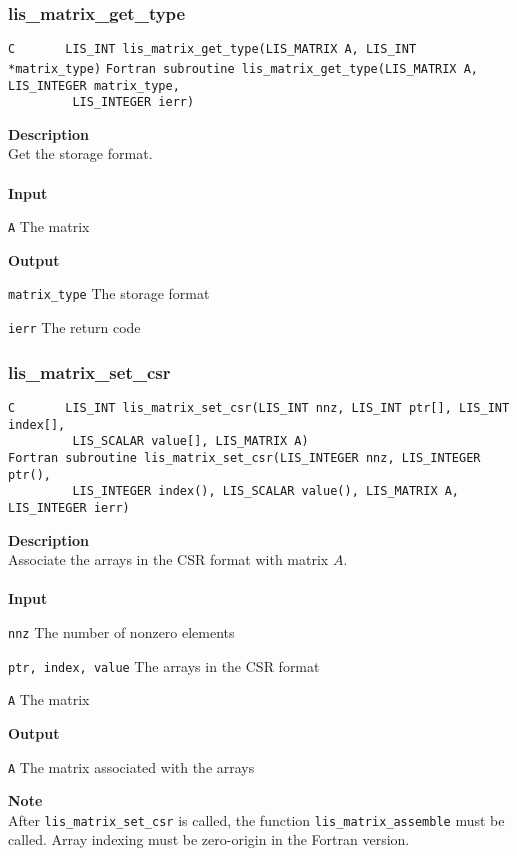 \documentclass[a4paper]{article}
\newcommand{\namelistlabel}[1]{\mbox{#1}\hfill}
\newenvironment{namelist}[1]{%
\begin{list}{}
  {\let\makelabel\namelistlabel
  \settowidth{\labelwidth}{#1}
  \setlength{\leftmargin}{1.1\labelwidth}}
  }{%
\end{list}}
\begin{document}
\subsubsection{lis\_matrix\_get\_type}
\begin{screen}
\verb|C       LIS_INT lis_matrix_get_type(LIS_MATRIX A, LIS_INT *matrix_type)|
\verb|Fortran subroutine lis_matrix_get_type(LIS_MATRIX A, LIS_INTEGER matrix_type,|\\
\verb|         LIS_INTEGER ierr)|
\end{screen}
{\bf Description}\\
\indent
Get the storage format.
\\ \\
\noindent
{\bf Input}
\begin{namelist}{XXXXXXXXXXXXXXXXXXXX}
\item[\tt A] The matrix
\end{namelist}
{\bf Output}
\begin{namelist}{XXXXXXXXXXXXXXXXXXXX}
\item[\tt matrix\_type] The storage format
\item[\tt ierr] The return code
\end{namelist}

\newpage
\subsubsection{lis\_matrix\_set\_csr}
\begin{screen}
\verb|C       LIS_INT lis_matrix_set_csr(LIS_INT nnz, LIS_INT ptr[], LIS_INT index[],|\\
\verb|         LIS_SCALAR value[], LIS_MATRIX A)|\\
\verb|Fortran subroutine lis_matrix_set_csr(LIS_INTEGER nnz, LIS_INTEGER ptr(),|\\
\verb|         LIS_INTEGER index(), LIS_SCALAR value(), LIS_MATRIX A, LIS_INTEGER ierr)|
\end{screen}
{\bf Description}\\
\indent
Associate the arrays in the CSR format with matrix $A$.
\\ \\
\noindent
{\bf Input}
\begin{namelist}{XXXXXXXXXXXXXXXXXXXX}
\item[\tt nnz] The number of nonzero elements
\item[\tt ptr, index, value] The arrays in the CSR format
\item[\tt A] The matrix
\end{namelist}
{\bf Output}
\begin{namelist}{XXXXXXXXXXXXXXXXXXXX}
\item[\tt A] The matrix associated with the arrays
\end{namelist}
\noindent
{\bf Note}\\
\indent
After \verb|lis_matrix_set_csr| is called, 
the function \verb|lis_matrix_assemble| must be called.
Array indexing must be zero-origin in the Fortran version.
\end{document}
